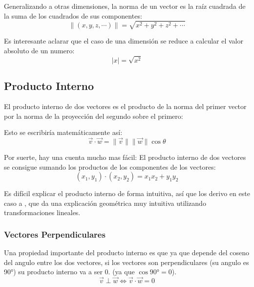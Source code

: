 \documentclass[../teoria.root.tex]{subfiles}
\begin{document}
Generalizando a otras dimensiones, la norma de un vector es la raíz cuadrada de
la suma de los cuadrados de sus componentes:
\[\|(x,y,z,\cdots)\|=\sqrt{x^2+y^2+z^2+\cdots}\]

Es interesante aclarar que el caso de una dimensión se reduce a calcular el
valor absoluto de un numero:
\[|x|=\sqrt{x^2}\]

\subsection{Producto Interno}

El producto interno de dos vectores es el producto de la norma del primer
vector por la norma de la proyección del segundo sobre el primero:

\begin{center}
\end{center}

Esto se escribiría matemáticamente así:
\[\vec{v}\cdot\vec{w}=\|\vec{v}\|\|\vec{w}\|\cos\theta\]

Por suerte, hay una cuenta mucho mas fácil: El producto interno de dos vectores
se consigue sumando los productos de los componentes de los vectores:
\[(x_1,y_1)\cdot(x_2,y_2)=x_1x_2+y_1y_2\]

Es difícil explicar el producto interno de forma intuitiva, así que los derivo
en este caso a \eola, que da una explicación geométrica muy intuitiva
utilizando transformaciones lineales.

\subsubsection{Vectores Perpendiculares}

Una propiedad importante del producto interno es que ya que depende del coseno
del angulo entre los dos vectores, si los vectores son perpendiculares (su
angulo es \ang{90}) su producto interno va a ser $0$. (ya que
$\cos\ang{90}=0$).
\[\vec{v}\perp\vec{w}\iff\vec{v}\cdot\vec{w}=0\]
\end{document}
